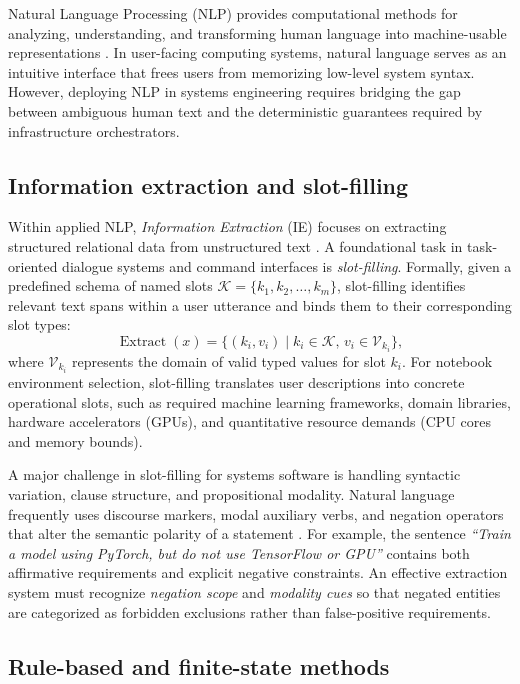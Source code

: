 Natural Language Processing (NLP) provides computational methods for analyzing, understanding, and transforming human language into machine-usable representations \cite{jurafsky2023slp}. In user-facing computing systems, natural language serves as an intuitive interface that frees users from memorizing low-level system syntax. However, deploying NLP in systems engineering requires bridging the gap between ambiguous human text and the deterministic guarantees required by infrastructure orchestrators.

\subsection{Information extraction and slot-filling}
\label{subsec:ie_slot_filling}

Within applied NLP, \emph{Information Extraction} (IE) focuses on extracting structured relational data from unstructured text \cite{jurafsky2023slp}. A foundational task in task-oriented dialogue systems and command interfaces is \emph{slot-filling}. Formally, given a predefined schema of named slots $\mathcal{K} = \{k_1, k_2, \ldots, k_m\}$, slot-filling identifies relevant text spans within a user utterance and binds them to their corresponding slot types:
\[
    \operatorname{Extract}(x) = \{(k_i, v_i) \mid k_i \in \mathcal{K}, \, v_i \in \mathcal{V}_{k_i}\},
\]
where $\mathcal{V}_{k_i}$ represents the domain of valid typed values for slot $k_i$. For notebook environment selection, slot-filling translates user descriptions into concrete operational slots, such as required machine learning frameworks, domain libraries, hardware accelerators (GPUs), and quantitative resource demands (CPU cores and memory bounds).

A major challenge in slot-filling for systems software is handling syntactic variation, clause structure, and propositional modality. Natural language frequently uses discourse markers, modal auxiliary verbs, and negation operators that alter the semantic polarity of a statement \cite{morante2012modality}. For example, the sentence \emph{``Train a model using PyTorch, but do not use TensorFlow or GPU''} contains both affirmative requirements and explicit negative constraints. An effective extraction system must recognize \emph{negation scope} and \emph{modality cues} so that negated entities are categorized as forbidden exclusions rather than false-positive requirements.

\subsection{Rule-based and finite-state methods}
\label{subsec:finite_state_nlp}

